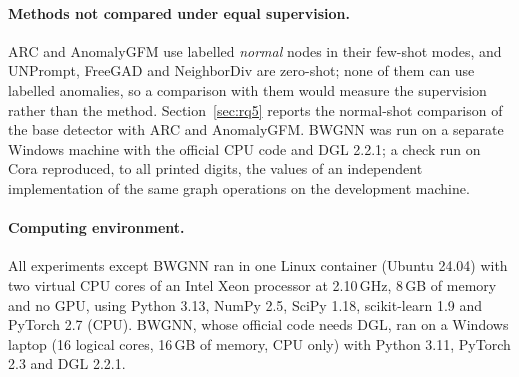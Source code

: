 \documentclass[pdflatex,sn-mathphys-ay]{sn-jnl}
\theoremstyle{plain}
\theoremstyle{remark}
\begin{document}
\paragraph{Methods not compared under equal supervision.} ARC and AnomalyGFM use labelled \emph{normal} nodes in their few-shot modes, and UNPrompt, FreeGAD and NeighborDiv are zero-shot; none of them can use labelled anomalies, so a comparison with them would measure the supervision rather than the method. Section~\ref{sec:rq5} reports the normal-shot comparison of the base detector with ARC and AnomalyGFM. BWGNN was run on a separate Windows machine with the official CPU code and DGL 2.2.1; a check run on Cora reproduced, to all printed digits, the values of an independent implementation of the same graph operations on the development machine.

\paragraph{Computing environment.} All experiments except BWGNN ran in one Linux container (Ubuntu 24.04) with two virtual CPU cores of an Intel Xeon processor at 2.10\,GHz, 8\,GB of memory and no GPU, using Python 3.13, NumPy 2.5, SciPy 1.18, scikit-learn 1.9 and PyTorch 2.7 (CPU). BWGNN, whose official code needs DGL, ran on a Windows laptop (16 logical cores, 16\,GB of memory, CPU only) with Python 3.11, PyTorch 2.3 and DGL 2.2.1.
\end{document}

